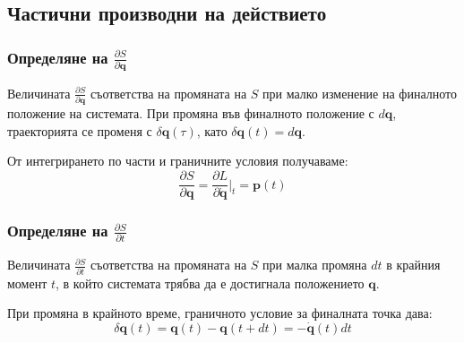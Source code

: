 \documentclass{report}
\begin{document}
\subsection{Частични производни на действието}
\subsubsection{Определяне на $\frac{\partial S}{\partial \mathbf{q}}$}


Величината $\frac{\partial S}{\partial \mathbf{q}}$ съответства на промяната на $S$ при малко изменение на финалното положение на системата. При промяна във финалното положение с $d\mathbf{q}$, траекторията се променя с $\delta\mathbf{q}(\tau)$, като $\delta\mathbf{q}(t) = d\mathbf{q}$.

От интегрирането по части и граничните условия получаваме:
\begin{equation}
\frac{\partial S}{\partial \mathbf{q}} = \frac{\partial L}{\partial \dot{\mathbf{q}}}\bigg|_{t} = \mathbf{p}(t)
\end{equation}




\subsubsection{Определяне на $\frac{\partial S}{\partial t}$}
Величината $\frac{\partial S}{\partial t}$ съответства на промяната на $S$ при малка промяна $dt$ в крайния момент $t$, в който системата трябва да е достигнала положението $\mathbf{q}$.

При промяна в крайното време, граничното условие за финалната точка дава:
\begin{equation}
\delta\mathbf{q}(t) = \mathbf{q}(t) - \mathbf{q}(t + dt) = -\dot{\mathbf{q}}(t) dt
\end{equation}
\end{document}
